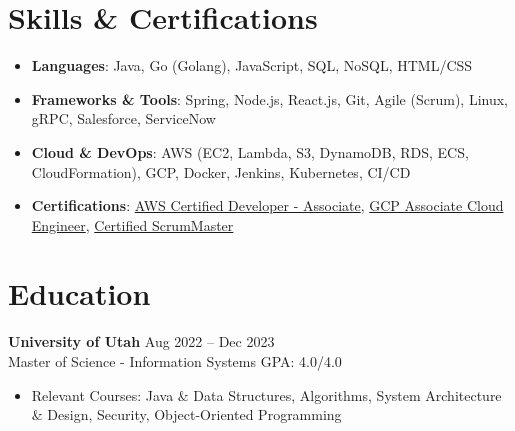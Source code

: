 \documentclass[letterpaper,10pt]{article}
\begin{document}
\section*{Skills \& Certifications}
\begin{itemize}
  \item \textbf{Languages}: Java, Go (Golang), JavaScript, SQL, NoSQL, HTML/CSS
  \item \textbf{Frameworks \& Tools}: Spring, Node.js, React.js, Git, Agile (Scrum), Linux, gRPC, Salesforce, ServiceNow
  \item \textbf{Cloud \& DevOps}: AWS (EC2, Lambda, S3, DynamoDB, RDS, ECS, CloudFormation), GCP, Docker, Jenkins, Kubernetes, CI/CD
  \item \textbf{Certifications}: \href{https://cp.certmetrics.com/amazon/en/public/verify/credential/3VVMZX8102R11NW5}{AWS Certified Developer - Associate}, \href{https://www.credential.net/39097155-62ed-4693-a866-1bb72aa7f8a1}{GCP Associate Cloud Engineer}, \href{https://bcert.me/bc/html/show-badge.html?b=smcrexys}{Certified ScrumMaster}
\end{itemize}

\section*{Education}
\textbf{University of Utah} \hfill Aug 2022 -- Dec 2023\\
Master of Science - Information Systems \quad GPA: 4.0/4.0
\begin{itemize}
  \item Relevant Courses: Java \& Data Structures, Algorithms, System Architecture \& Design, Security, Object-Oriented Programming
\end{itemize}
\end{document}
